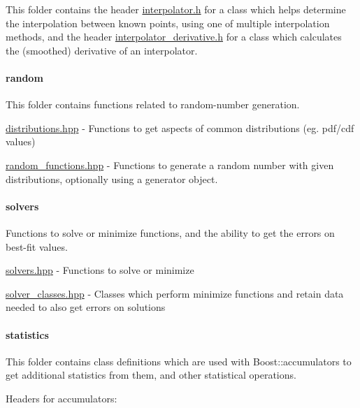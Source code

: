 This folder contains the header \hyperlink{interpolator_8h}{interpolator.\+h} for a class which helps determine the interpolation between known points, using one of multiple interpolation methods, and the header \hyperlink{interpolator__derivative_8h}{interpolator\+\_\+derivative.\+h} for a class which calculates the (smoothed) derivative of an interpolator.

\paragraph*{random}

This folder contains functions related to random-\/number generation.


\begin{DoxyItemize}
\item \hyperlink{distributions_8hpp}{distributions.\+hpp} -\/ Functions to get aspects of common distributions (eg. pdf/cdf values)
\item \hyperlink{random__functions_8hpp}{random\+\_\+functions.\+hpp} -\/ Functions to generate a random number with given distributions, optionally using a generator object.
\end{DoxyItemize}

\paragraph*{solvers}

Functions to solve or minimize functions, and the ability to get the errors on best-\/fit values.


\begin{DoxyItemize}
\item \hyperlink{solvers_8hpp}{solvers.\+hpp} -\/ Functions to solve or minimize
\item \hyperlink{solver__classes_8hpp}{solver\+\_\+classes.\+hpp} -\/ Classes which perform minimize functions and retain data needed to also get errors on solutions
\end{DoxyItemize}

\paragraph*{statistics}

This folder contains class definitions which are used with Boost\+::accumulators to get additional statistics from them, and other statistical operations.

Headers for accumulators\+:


